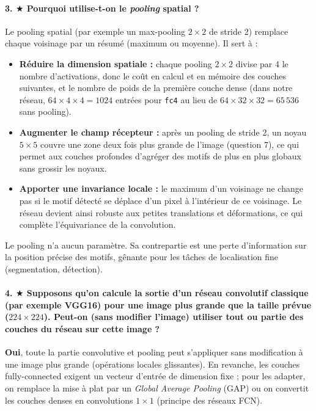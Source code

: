 \documentclass{report}
\begin{document}
\paragraph{3. $\bigstar$ Pourquoi utilise-t-on le \textit{pooling} spatial ?}
 Le pooling spatial (par exemple un max-pooling $2 \times 2$ de stride 2) remplace chaque voisinage par un résumé (maximum ou moyenne). Il sert à :
\begin{itemize}
    \item \textbf{Réduire la dimension spatiale :} chaque pooling $2 \times 2$ divise par 4 le nombre d'activations, donc le coût en calcul et en mémoire des couches suivantes, et le nombre de poids de la première couche dense (dans notre réseau, $64 \times 4 \times 4 = 1024$ entrées pour \texttt{fc4} au lieu de $64 \times 32 \times 32 = 65\,536$ sans pooling).
    \item \textbf{Augmenter le champ récepteur :} après un pooling de stride 2, un noyau $5 \times 5$ couvre une zone deux fois plus grande de l'image (question 7), ce qui permet aux couches profondes d'agréger des motifs de plus en plus globaux sans grossir les noyaux.
    \item \textbf{Apporter une invariance locale :} le maximum d'un voisinage ne change pas si le motif détecté se déplace d'un pixel à l'intérieur de ce voisinage. Le réseau devient ainsi robuste aux petites translations et déformations, ce qui complète l'équivariance de la convolution.
\end{itemize}
Le pooling n'a aucun paramètre. Sa contrepartie est une perte d'information sur la position précise des motifs, gênante pour les tâches de localisation fine (segmentation, détection).

\paragraph{4. $\bigstar$ Supposons qu'on calcule la sortie d'un réseau convolutif classique (par exemple VGG16) pour une image plus grande que la taille prévue ($224 \times 224$). Peut-on (sans modifier l'image) utiliser tout ou partie des couches du réseau sur cette image ?}
 \textbf{Oui}, toute la partie convolutive et pooling peut s'appliquer sans modification à une image plus grande (opérations locales glissantes). En revanche, les couches fully-connected exigent un vecteur d'entrée de dimension fixe ; pour les adapter, on remplace la mise à plat par un \textit{Global Average Pooling} (GAP) ou on convertit les couches denses en convolutions $1 \times 1$ (principe des réseaux FCN).
\end{document}

